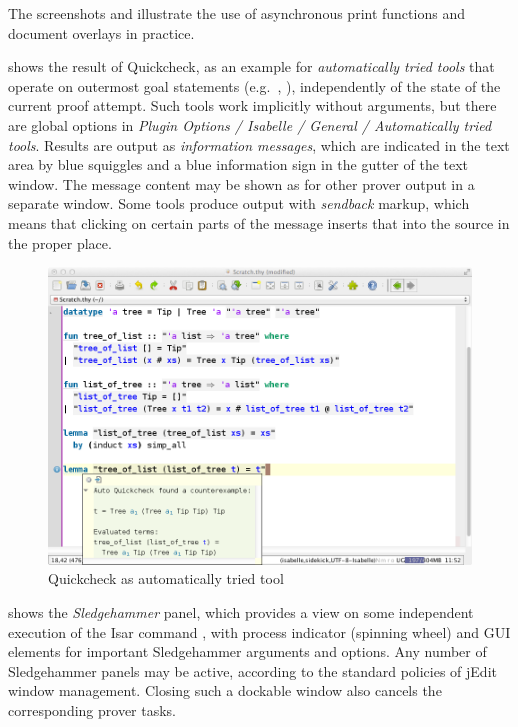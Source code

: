 \begin{isabellebody}
\begin{isamarkuptext}
\begin{itemize}
\end{itemize}

The screenshots  and 
illustrate the use of asynchronous print functions and document overlays in
practice.

\medskip {} shows the result of Quickcheck, as an
example for \emph{automatically tried tools} that operate on outermost goal
statements (e.g.\ \hyperlink{command.lemma}{\mbox{}}, \hyperlink{command.theorem}{\mbox{}}), independently of
the state of the current proof attempt. Such tools work implicitly without
arguments, but there are global options in \emph{Plugin Options / Isabelle /
General / Automatically tried tools}. Results are output as
\emph{information messages}, which are indicated in the text area by blue
squiggles and a blue information sign in the gutter of the text window. The
message content may be shown as for other prover output in a separate
window. Some tools produce output with \emph{sendback} markup, which means
that clicking on certain parts of the message inserts that into the source
in the proper place.

\begin{figure}[htb]
\begin{center}
\includegraphics[scale=0.333]{auto-tools}
\end{center}
\caption{Quickcheck as automatically tried tool}
\label{fig:auto-tools}
\end{figure}

\medskip {} shows the \emph{Sledgehammer} panel,
which provides a view on some independent execution of the Isar command
\hyperlink{command.sledgehammer}{\mbox{}}, with process indicator (spinning wheel) and GUI
elements for important Sledgehammer arguments and options. Any number of
Sledgehammer panels may be active, according to the standard policies of
jEdit window management. Closing such a dockable window also cancels the
corresponding prover tasks.


\end{isamarkuptext}
\end{isabellebody}

